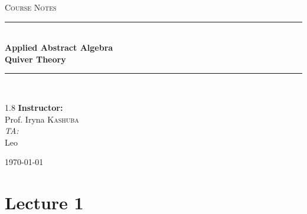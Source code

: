 \documentclass[11pt, a4paper]{report}
\newcommand{\HRule}[1]{\rule{\linewidth}{#1}}
\begin{document}
\begin{titlepage}
    \centering
    \vspace*{2cm}
    
    \textsc{\Large Course Notes}\\[0.5cm]

    \HRule{1.5pt} \\[0.5cm]
    { \huge \bfseries Applied Abstract Algebra \\[0.3cm] Quiver Theory }\\[0.4cm] 
    \HRule{1.5pt} \\[1.5cm]
    
    \vspace{3cm}

    \begin{spacing}{1.8}
        {\Large \textbf{Instructor:}} \\
        {\Large Prof. Iryna \textsc{Kashuba}} \\[0.8cm]
        
        {\normalsize \textit{TA:}} \\
        {\normalsize Leo}
    \end{spacing}

    \vfill
    {\large \today}
\end{titlepage}
\newpage
\tableofcontents
\newpage



\chapter{Lecture 1}
\end{document}
